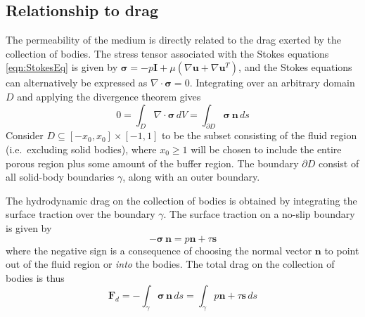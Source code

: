 \documentclass[3p]{elsarticle}
\newcommand{\grad}{{\nabla}}
\newcommand{\nn}{{\mathbf{n}}}
\renewcommand{\ss}{{\mathbf{s}}}
\newcommand{\uu}{{\mathbf{u}}}
\newcommand{\bvec}[1]{\mathbf{#1}}
\newcommand{\stress}{{\boldsymbol \sigma}}
\newcommand{\FD}{\bvec{F}_d}
\begin{document}

\subsection{Relationship to drag}

The permeability of the medium is directly related to the drag exerted by the collection of bodies. The stress tensor associated with the Stokes equations \eqref{eqn:StokesEq} is given by $\stress = -p \bvec{I} + \mu \left( \grad \uu + \grad \uu^T \right)$, and the Stokes equations can alternatively be expressed as $\grad \cdot \stress = 0$. Integrating over an arbitrary domain $D$ and applying the divergence theorem gives
\begin{equation}
\label{divthm}
0 = \int_{D} \grad \cdot \stress \, dV 
= \int_{\partial D} \stress \, \nn \, ds
\end{equation}
Consider $D \subseteq [-x_0, x_0] \times [-1, 1]$ to be the subset consisting of the fluid region (i.e.~excluding solid bodies), where $x_0 \ge 1$ will be chosen to include the entire porous region plus some amount of the buffer region. The boundary $\partial D$ consist of all solid-body boundaries $\gamma$, along with an outer boundary. 

The hydrodynamic drag on the collection of bodies is obtained by integrating the surface traction over the boundary $\gamma$. The surface traction on a no-slip boundary is given by 
\begin{equation}
- \stress \, \nn = p \nn + \tau \ss
\end{equation}
where the negative sign is a consequence of choosing the normal vector $\nn$ to point out of the fluid region or {\em into} the bodies. The total drag on the collection of bodies is thus
\begin{equation}
\label{eqn:drag}
\FD =  - \int_{\gamma} \stress \, \nn \, ds =  \int_{\gamma} p \nn + \tau \ss \, ds
\end{equation}

\end{document}
